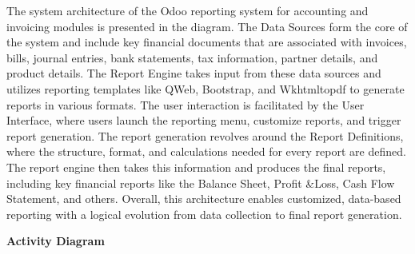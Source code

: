 \documentclass[11pt,a4paper]{article}
\begin{document}
\noindent The system architecture of the Odoo reporting system for accounting and invoicing modules is 
presented in the diagram. The Data Sources form the core of the system and include key 
financial documents that are associated with invoices, bills, journal entries, bank statements, tax 
information, partner details, and product details. The Report Engine takes input from these data 
sources and utilizes reporting templates like QWeb, Bootstrap, and Wkhtmltopdf to generate 
reports in various formats. The user interaction is facilitated by the User Interface, where users 
launch the reporting menu, customize reports, and trigger report generation. The report 
generation revolves around the Report Definitions, where the structure, format, and calculations 
needed for every report are defined. The report engine then takes this information and produces 
the final reports, including key financial reports like the Balance Sheet, Profit \&Loss, Cash 
Flow Statement, and others. Overall, this architecture enables customized, data-based reporting 
with a logical evolution from data collection to final report generation.

\newpage
\noindent\textbf{Activity Diagram}
\end{document}
